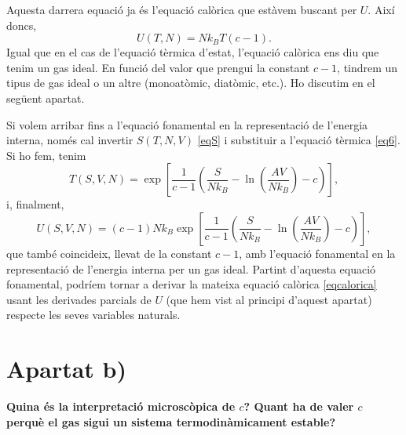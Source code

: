 \documentclass[a4paper, 10pt]{article}
\begin{document}
Aquesta darrera equació ja és l'equació calòrica que estàvem buscant per $U$. Així doncs,
\begin{equation}
	\boxed{U(T,N) = Nk_BT(c-1)}. \label{eqcalorica}
\end{equation}
Igual que en el cas de l'equació tèrmica d'estat, l'equació calòrica ens diu que tenim un gas ideal. En funció del valor que prengui la constant $c-1$, tindrem un tipus de gas ideal o un altre (monoatòmic, diatòmic, etc.). Ho discutim en el següent apartat.

Si volem arribar fins a l'equació fonamental en la representació de l'energia interna, només cal invertir $S(T,N,V)$ \eqref{eqS} i substituir a l'equació tèrmica \eqref{eq6}. Si ho fem, tenim
\begin{equation}
	T(S,V,N) = \exp[\frac{1}{c-1}\left(\frac{S}{Nk_B}-\ln(\frac{AV}{Nk_B})-c\right)] \label{eqT},
\end{equation}
i, finalment,
\begin{equation}
	U(S,V,N) = (c-1)Nk_B\exp[\frac{1}{c-1}\left(\frac{S}{Nk_B}-\ln(\frac{AV}{Nk_B})-c\right)],
\end{equation}
que també coincideix, llevat de la constant $c-1$, amb l'equació fonamental en la representació de l'energia interna per un gas ideal. Partint d'aquesta equació fonamental, podríem tornar a derivar la mateixa equació calòrica \eqref{eqcalorica} usant les derivades parcials de $U$ (que hem vist al principi d'aquest apartat) respecte les seves variables naturals.
\section*{Apartat b)}
\textbf{Quina és la interpretació microscòpica de $c$? Quant ha de valer $c$ perquè el gas sigui un sistema termodinàmicament estable?}
\end{document}
